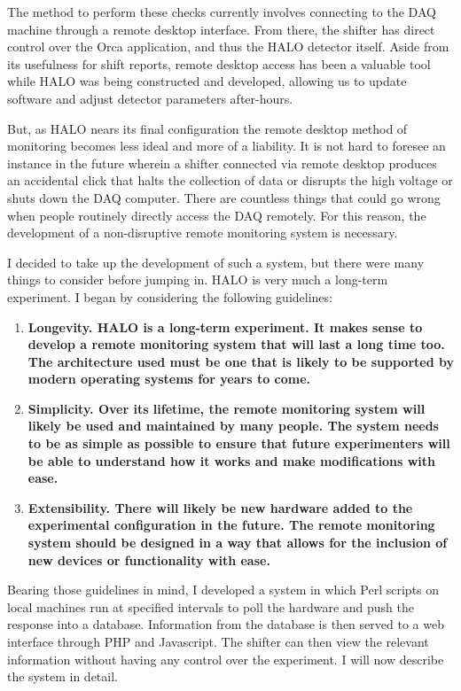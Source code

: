 		The method to perform these checks currently involves connecting to the DAQ machine through a remote desktop interface. From there, the shifter has direct control over the Orca application, and thus the HALO detector itself. Aside from its usefulness for shift reports, remote desktop access has been a valuable tool while HALO was being constructed and developed, allowing us to update software and adjust detector parameters after-hours. 

		But, as HALO nears its final configuration the remote desktop method of monitoring becomes less ideal and more of a liability. It is not hard to foresee an instance in the future wherein a shifter connected via remote desktop produces an accidental click that halts the collection of data or disrupts the high voltage or shuts down the DAQ computer. There are countless things that could go wrong when people routinely directly access the DAQ remotely. For this reason, the development of a non-disruptive remote monitoring system is necessary.

		I decided to take up the development of such a system, but there were many things to consider before jumping in. HALO is very much a long-term experiment. I began by considering the following guidelines:

		\begin{enumerate}
		\item \bf Longevity. \rm HALO is a long-term experiment. It makes sense to develop a remote monitoring system that will last a long time too. The architecture used must be one that is likely to be supported by modern operating systems for years to come.
		\item \bf Simplicity. \rm Over its lifetime, the remote monitoring system will likely be used and maintained by many people. The system needs to be as simple as possible to ensure that future experimenters will be able to understand how it works and make modifications with ease.
		\item \bf Extensibility. \rm There will likely be new hardware added to the experimental configuration in the future. The remote monitoring system should be designed in a way that allows for the inclusion of new devices or functionality with ease. 
		\end{enumerate}

		Bearing those guidelines in mind, I developed a system in which Perl scripts on local machines run at specified intervals to poll the hardware and push the response into a database. Information from the database is then served to a web interface through PHP and Javascript. The shifter can then view the relevant information without having any control over the experiment. I will now describe the system in detail.

